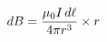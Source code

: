 \documentclass[preview]{standalone}
\begin{document}
\begin{align*}
dB  =  {\mu_0 I \, d\ell \over  4\pi  r^3 }  \times r
\end{align*}
\end{document}
